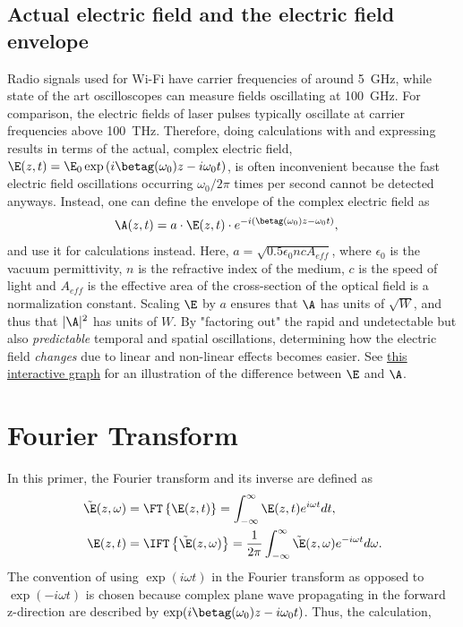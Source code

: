 \subsection{Actual electric field and the electric field envelope}
Radio signals used for Wi-Fi have carrier frequencies of around 5~GHz, while state of the art oscilloscopes can measure fields oscillating at 100~GHz. For comparison, the electric fields of laser pulses typically oscillate at carrier frequencies above 100~THz. Therefore, doing calculations with and expressing results in terms of the actual, complex electric field, $\E(z,t) =\E_0 \exp\left( i\betag(\omega_0)z-i\omega_0 t\right)$, is often inconvenient because the fast electric field oscillations occurring $\omega_0/2\pi$ times per second cannot be detected anyways. Instead, one can define the envelope of the complex electric field as
\begin{align}
\label{eq:envelope}
    \A(z,t) &=a\cdot\E(z,t)\cdot e^{-i(\betag(\omega_0)z-\omega_0t)},
\end{align}
and use it for calculations instead. Here, $a=\sqrt{0.5\epsilon_0ncA_{eff}}$, where $\epsilon_0$ is the vacuum permittivity, $n$ is the refractive index of the medium, $c$ is the speed of light and $A_{eff}$ is the effective area of the cross-section of the optical field is a normalization constant. Scaling $\E$ by $a$ ensures that $\A$ has units of $\sqrt{W}$, and thus that $|\A|^2$ has units of $W$. By "factoring out" the rapid and undetectable but also \emph{predictable} temporal and spatial oscillations, determining how the electric field \emph{changes} due to linear and non-linear effects becomes easier. See \href{https://www.desmos.com/calculator/rsw2fn5af6 }{this interactive graph} for an illustration of the difference between $\E$ and $\A$. 



\section{Fourier Transform}

In this primer, the Fourier transform and its inverse are defined as
\begin{align}
    \Tilde{\E}(z,\omega) &= \FT\left\{\E(z,t)\right\} = \int_{-\infty}^{\infty} \E(z,t) e^{i\omega t} dt, \\ \nonumber
    \E(z,t) &= \IFT\left\{\Tilde{\E}(z,\omega)\right\} = \frac{1}{2\pi} \int_{-\infty}^{\infty} \Tilde{\E}(z,\omega) e^{-i\omega t} d\omega.
\end{align}
The convention of using $\exp(i\omega t)$ in the Fourier transform as opposed to $\exp(-i\omega t)$ is chosen because complex plane wave propagating in the forward z-direction are described by $\exp(i\betag(\omega_0)z-i\omega_0 t)$. Thus, the calculation,

